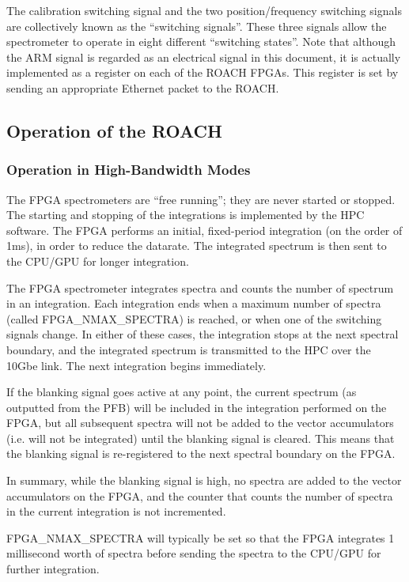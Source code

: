 \documentclass[11pt]{article} %
\begin{document}
The calibration switching signal and the two position/frequency switching signals are collectively known as the ``switching signals''. These three signals allow the spectrometer to operate in eight different ``switching states''. Note that although the ARM signal is regarded as an electrical signal in this document, it is actually implemented as a register on each of the ROACH FPGAs. This register is set by sending an appropriate Ethernet packet to the ROACH.

\subsection {Operation of the ROACH}

\subsubsection {Operation in High-Bandwidth Modes}

The FPGA spectrometers are ``free running''; they are never started or stopped. The starting and stopping of the integrations is implemented by the HPC software. The FPGA performs an initial, fixed-period integration (on the order of 1ms), in order to reduce the datarate. The integrated spectrum is then sent to the CPU/GPU for longer integration.

The FPGA spectrometer integrates spectra and counts the number of spectrum in an integration. Each integration ends when a maximum number of spectra (called FPGA\_NMAX\_SPECTRA) is reached, or when one of the switching signals change. In either of these cases, the integration stops at the next spectral boundary, and the integrated spectrum is transmitted to the HPC over the 10Gbe link. The next integration begins immediately.

If the blanking signal goes active at any point, the current spectrum (as outputted from the PFB) will be included in the integration performed on the FPGA, but all subsequent spectra will not be added to the vector accumulators (i.e. will not be integrated) until the blanking signal is cleared. This means that the blanking signal is re-registered to the next spectral boundary on the FPGA.

In summary, while the blanking signal is high, no spectra are added to the vector accumulators on the FPGA, and the counter that counts the number of spectra in the current integration is not incremented.

FPGA\_NMAX\_SPECTRA will typically be set so that the FPGA integrates 1 millisecond worth of spectra before sending the spectra to the CPU/GPU for further integration.
\end{document}
